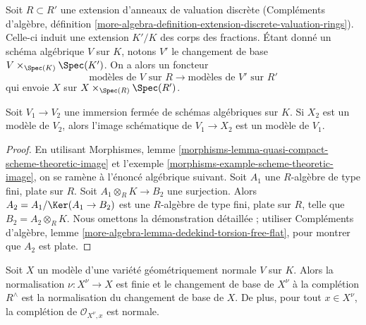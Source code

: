 \medskip\noindent
Soit $R \subset R'$ une extension d'anneaux de valuation discrète
(Compléments d'algèbre, définition
\ref{more-algebra-definition-extension-discrete-valuation-rings}).
Celle-ci induit une extension $K'/K$ des corps des fractions.
Étant donné un schéma algébrique $V$ sur $K$, notons $V'$ le
changement de base $V \times_{\Spec(K)} \Spec(K')$. On a alors
un foncteur
$$
\text{modèles de }V\text{ sur }R
\longrightarrow
\text{modèles de }V'\text{ sur }R'
$$
qui envoie $X$ sur $X \times_{\Spec(R)} \Spec(R')$.

\begin{lemma}
\label{lemma-closure-is-model}
Soit $V_1 \to V_2$ une immersion fermée de schémas algébriques sur $K$.
Si $X_2$ est un modèle de $V_2$, alors l'image schématique
de $V_1 \to X_2$ est un modèle de $V_1$.
\end{lemma}

\begin{proof}
En utilisant
Morphismes, lemme \ref{morphisms-lemma-quasi-compact-scheme-theoretic-image} et
l'exemple \ref{morphisms-example-scheme-theoretic-image},
on se ramène à l'énoncé algébrique suivant.
Soit $A_1$ une $R$-algèbre de type fini, plate sur $R$.
Soit $A_1 \otimes_R K \to B_2$ une surjection. Alors
$A_2 = A_1 / \Ker(A_1 \to B_2)$ est une $R$-algèbre de type fini,
plate sur $R$, telle que $B_2 = A_2 \otimes_R K$.
Nous omettons la démonstration détaillée ; utiliser
Compléments d'algèbre, lemme \ref{more-algebra-lemma-dedekind-torsion-free-flat},
pour montrer que $A_2$ est plate.
\end{proof}

\begin{lemma}
\label{lemma-normalization}
Soit $X$ un modèle d'une variété géométriquement normale $V$ sur $K$.
Alors la normalisation $\nu : X^\nu \to X$ est finie et
le changement de base de $X^\nu$ à la complétion $R^\wedge$
est la normalisation du changement de base de $X$. De plus, pour
tout $x \in X^\nu$, la complétion de $\mathcal{O}_{X^\nu, x}$
est normale.
\end{lemma}

